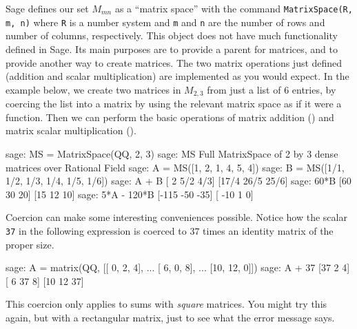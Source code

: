 Sage defines our set $M_{mn}$ as a ``matrix space'' with the command \texttt{MatrixSpace(R, m, n)} where \verb?R? is a number system and \verb?m? and \verb?n? are the number of rows and number of columns, respectively.  This object does not have much functionality defined in Sage.  Its main purposes are to provide a parent for matrices, and to provide another way to create matrices.  The two matrix operations just defined (addition and scalar multiplication) are implemented as you would expect.  In the example below, we create two matrices in $M_{2,3}$ from just a list of 6 entries, by coercing the list into a matrix by using the relevant matrix space as if it were a function.  Then we can perform the basic operations of matrix addition () and matrix scalar multiplication ().
%
%
\begin{sageexample}
sage: MS = MatrixSpace(QQ, 2, 3)
sage: MS
Full MatrixSpace of 2 by 3 dense matrices over Rational Field
sage: A = MS([1, 2, 1, 4, 5, 4])
sage: B = MS([1/1, 1/2, 1/3, 1/4, 1/5, 1/6])
sage: A + B
[   2  5/2  4/3]
[17/4 26/5 25/6]
sage: 60*B
[60 30 20]
[15 12 10]
sage: 5*A - 120*B
[-115  -50  -35]
[ -10    1    0]
\end{sageexample}
%
Coercion can make some interesting conveniences possible.  Notice how the scalar \verb?37? in the following expression is coerced to $37$ times an identity matrix of the proper size.
%
\begin{sageexample}
sage: A = matrix(QQ, [[ 0,  2, 4],
...                   [ 6,  0, 8],
...                   [10, 12, 0]])
sage: A + 37
[37  2  4]
[ 6 37  8]
[10 12 37]
\end{sageexample}
%
This coercion only applies to sums with \emph{square} matrices.  You might try this again, but with a rectangular matrix, just to see what the error message says.
%
\begin{sageverbatim}
\end{sageverbatim}
%
